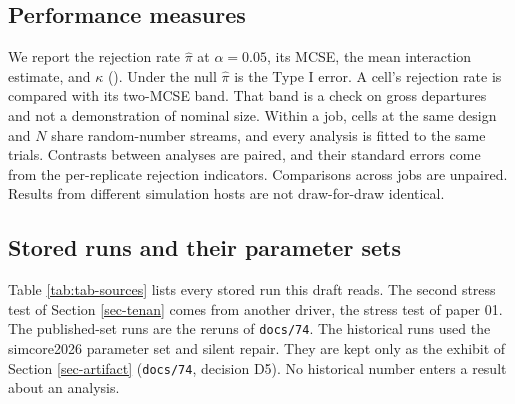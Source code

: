 \documentclass[
  11pt,
]{article}
\begin{document}
\subsection{Performance measures}\label{sec-perf}

We report the rejection rate \(\hat\pi\) at \(\alpha = 0.05\), its MCSE,
the mean interaction estimate, and \(\kappa\) ().
Under the null \(\hat\pi\) is the Type I error. A cell's rejection rate
is compared with its two-MCSE band. That band is a check on gross
departures and not a demonstration of nominal size. Within a job,
cells at the same design and \(N\) share random-number streams, and
every analysis is fitted to the same trials. Contrasts between
analyses are paired, and their standard errors come from the
per-replicate rejection indicators. Comparisons across jobs are
unpaired. Results from different simulation hosts are not
draw-for-draw identical.

\subsection{Stored runs and their parameter sets}\label{sec-sources}

Table \ref{tab:tab-sources} lists every stored run this draft reads.
The second stress test of Section \ref{sec-tenan} comes from another
driver, the stress test of paper 01.
The published-set runs are the reruns of \texttt{docs/74}. The historical
runs used the simcore2026 parameter set and silent repair. They are
kept only as the exhibit of Section \ref{sec-artifact}
(\texttt{docs/74}, decision D5). No historical number enters a result about
an analysis.
\end{document}
